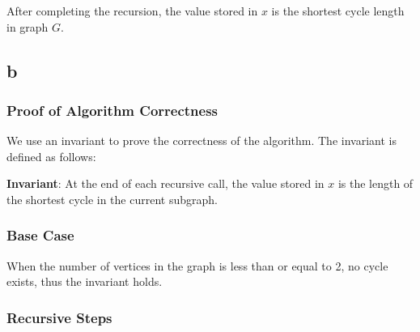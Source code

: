 \documentclass[12pt]{article}
\begin{document}
        After completing the recursion, the value stored in \(x\) is the shortest cycle length in graph \(G\).


    \subsection*{b}

        \subsubsection*{Proof of Algorithm Correctness}

        \hspace{1.5em}We use an invariant to prove the correctness of the algorithm. The invariant is defined as follows:

        \textbf{Invariant}: At the end of each recursive call, the value stored in \( x \) is the length of the shortest cycle in the current subgraph.

        \subsubsection*{Base Case}

        When the number of vertices in the graph is less than or equal to 2, no cycle exists, thus the invariant holds.

        \subsubsection*{Recursive Steps}
\end{document}
